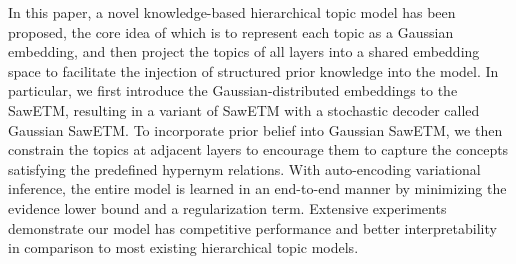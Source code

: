 \documentclass{article}
\begin{document}
In this paper, a novel knowledge-based hierarchical topic model has been proposed, the core idea of which is to represent each topic as a Gaussian embedding, and then project the topics of all layers into a shared embedding space to facilitate the injection of structured prior knowledge into the model. In particular, we first introduce the Gaussian-distributed embeddings to the SawETM, resulting in a variant of SawETM with a stochastic decoder called Gaussian SawETM. To incorporate prior belief into Gaussian SawETM, we then %
constrain the topics at adjacent layers to encourage them to capture the concepts satisfying the predefined hypernym relations. With auto-encoding variational inference, the entire model is learned in an end-to-end manner by minimizing the evidence lower bound and a regularization term. Extensive experiments demonstrate our model has competitive performance and better interpretability in comparison to most existing hierarchical topic models.
\end{document}
